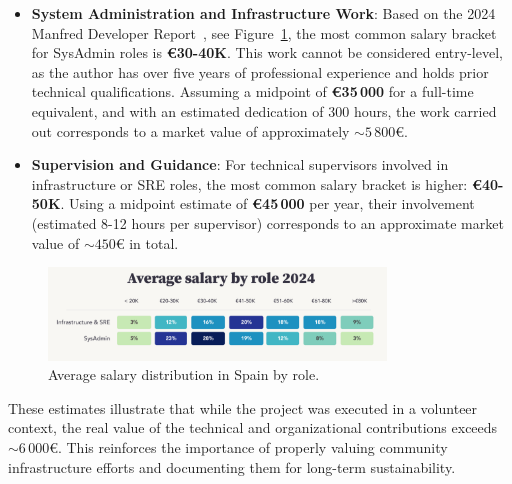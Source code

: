 \begin{itemize}
  \item \textbf{System Administration and Infrastructure Work}: Based on the 2024 Manfred Developer Report~\cite{manfred-salary-guide}, see Figure~\ref{fig:salary-chart}, the most common salary bracket for SysAdmin roles is \textbf{€30-40K}. This work cannot be considered entry-level, as the author has over five years of professional experience and holds prior technical qualifications. Assuming a midpoint of \textbf{€35\,000} for a full-time equivalent, and with an estimated dedication of 300 hours, the work carried out corresponds to a market value of approximately \(\sim 5\,800€\).

  \item \textbf{Supervision and Guidance}: For technical supervisors involved in infrastructure or SRE roles, the most common salary bracket is higher: \textbf{€40-50K}. Using a midpoint estimate of \textbf{€45\,000} per year, their involvement (estimated 8-12 hours per supervisor) corresponds to an approximate market value of \(\sim 450€\) in total.
\end{itemize}

\begin{figure}[H]
  \centering
  \includegraphics[width=0.8\textwidth]{imaxes/salary-chart.png}
  \caption{Average salary distribution in Spain by role.}
  \label{fig:salary-chart}
\end{figure}

These estimates illustrate that while the project was executed in a volunteer context, the real value of the technical and organizational contributions exceeds \(\sim 6\,000€\). This reinforces the importance of properly valuing community infrastructure efforts and documenting them for long-term sustainability.
